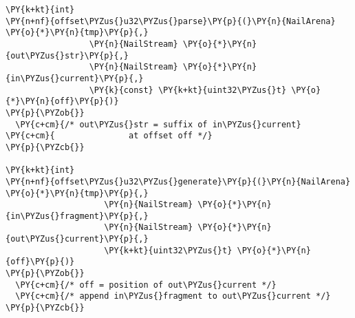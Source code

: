 \begin{Verbatim}[commandchars=\\\{\},codes={\catcode`\$=3\catcode`\^=7\catcode`\_=8}]
\PY{k+kt}{int}
\PY{n+nf}{offset\PYZus{}u32\PYZus{}parse}\PY{p}{(}\PY{n}{NailArena} \PY{o}{*}\PY{n}{tmp}\PY{p}{,}
                 \PY{n}{NailStream} \PY{o}{*}\PY{n}{out\PYZus{}str}\PY{p}{,}
                 \PY{n}{NailStream} \PY{o}{*}\PY{n}{in\PYZus{}current}\PY{p}{,}
                 \PY{k}{const} \PY{k+kt}{uint32\PYZus{}t} \PY{o}{*}\PY{n}{off}\PY{p}{)}
\PY{p}{\PYZob{}}
  \PY{c+cm}{/* out\PYZus{}str = suffix of in\PYZus{}current}
\PY{c+cm}{               at offset off */}
\PY{p}{\PYZcb{}}

\PY{k+kt}{int}
\PY{n+nf}{offset\PYZus{}u32\PYZus{}generate}\PY{p}{(}\PY{n}{NailArena} \PY{o}{*}\PY{n}{tmp}\PY{p}{,}
                    \PY{n}{NailStream} \PY{o}{*}\PY{n}{in\PYZus{}fragment}\PY{p}{,}
                    \PY{n}{NailStream} \PY{o}{*}\PY{n}{out\PYZus{}current}\PY{p}{,}
                    \PY{k+kt}{uint32\PYZus{}t} \PY{o}{*}\PY{n}{off}\PY{p}{)}
\PY{p}{\PYZob{}}
  \PY{c+cm}{/* off = position of out\PYZus{}current */}
  \PY{c+cm}{/* append in\PYZus{}fragment to out\PYZus{}current */}
\PY{p}{\PYZcb{}}
\end{Verbatim}
